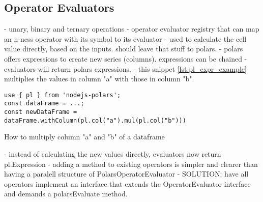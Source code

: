 \subsection{Operator Evaluators}
- unary, binary and ternary operations
- operator evaluator registry that can map an n-ness operator with its symbol to its evaluator
- used to calculate the cell value directly, based on the inputs. should leave that stuff to polars.
- polars offers expressions to create new series (columns). expressions can be chained
- evaluators will return polars expressions.
- this snippet \ref{lst:pl_expr_example} multiplies the values in column "a" with those in column "b".
\begin{listing}
	\begin{verbatim}
use { pl } from 'nodejs-polars';
const dataFrame = ...;
const newDataFrame = dataFrame.withColumn(pl.col("a").mul(pl.col("b")))
	\end{verbatim}
	\caption{How to multiply column "a" and "b" of a dataframe}
	\label{lst:pl_expr_example}
\end{listing}
- instead of calculating the new values directly, evaluators now return pl.Expression
- adding a method to existing operators is simpler and clearer than having a paralell structure of PolarsOperatorEvaluator
- SOLUTION: have all operators implement an interface that extends the OperatorEvaluator interface and demands a polarsEvaluate method.
